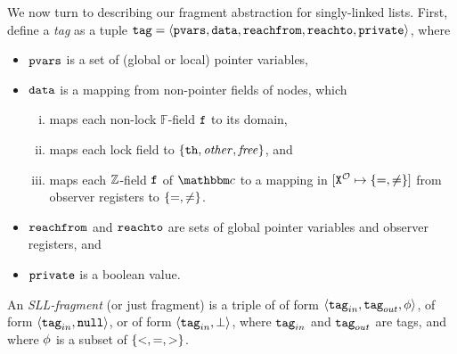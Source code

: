 We now turn to describing our fragment abstraction for singly-linked lists.
First, define a {\em tag} as a tuple
$\mathtt{tag} = \left\langle\mathtt{pvars},\mathtt{data},\mathtt{reachfrom},\mathtt{reachto},\mathtt{private}\right\rangle$, where
\begin{itemize}
\item
  $\mathtt{pvars}$ is a set of (global or local) pointer variables,
\item
  $\mathtt{data}$ is a mapping from non-pointer fields of nodes, which
  \begin{enumerate}[(i)]
  \item
  maps each non-lock $\mathbb{F}$-field $\mathtt{f}$ to its domain, 
  \item
    maps each  lock field
    to $\left\{{\tt th},\mathit{other},\mathit{free}\right\}$,
  and
\item
  maps each ${\mathbb Z}$-field $\mathtt{f}$ of $\cell$ to a mapping in
  $[{\tt X}^{{\mathcal O}} \mapsto{\left\{=,\neq\right\}}]$ from observer registers to
  $\left\{=,\neq\right\}$.
  \end{enumerate}
 \item
   $\mathtt{reachfrom}$ and $\mathtt{reachto}$ are sets of global pointer variables and observer registers, and
  \item $\mathtt{private}$ is a boolean value.
\end{itemize}

\begin{definition}
\label{def:sll-fragment}
An {\em SLL-fragment} (or just fragment)
is a triple of of form
$\left\langle\mathtt{tag}_{in},\mathtt{tag}_{out},\phi\right\rangle$, of form
$\left\langle\mathtt{tag}_{in},{\tt null}\right\rangle$, or of form
$\left\langle\mathtt{tag}_{in},\bot\right\rangle$,
where $\mathtt{tag}_{in}$ and $\mathtt{tag}_{out}$ are tags,
    and where $\phi$ is a subset of $\left\{<, =, >\right\}$.
\end{definition}

